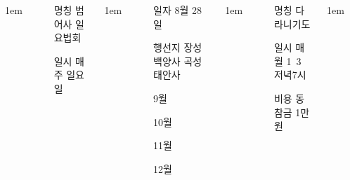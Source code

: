 \documentclass[	20pt, 
							a1paper, 
							portrait, %
							margin=0mm, %
							innermargin=10mm,  		%
							colspace=5mm, 
							subcolspace=0mm
							]{tikzposter}
\begin{document}
\begin{columns}


			{
					\setlength{\leftmargini}{4em}
					\setlength{\labelsep} {1em}
				\begin{LARGE}
					\begin{itemize}
					\item [명칭] 범어사 일요법회
					\item [일시] 매주 일요일
					\end{itemize}
				\end{LARGE}
			}


			{
					\setlength{\leftmargini}{5em}
					\setlength{\labelsep} {1em}
				\begin{LARGE}
					\begin{itemize}
					\item [일자] 8월 28일
					\item [행선지] 장성 백양사 곡성 태안사
					\item [9월] 
					\item [10월] 
					\item [11월] 
					\item [12월] 

					\end{itemize}
				\end{LARGE}
			}


			{
					\setlength{\leftmargini}{4em}
					\setlength{\labelsep} {1em}
				\begin{LARGE}
					\begin{itemize}
					\item [명칭] 다라니기도
					\item [일시] 매월 1~3 저녁7시
					\item [비용] 동참금 1만원
					\end{itemize}
				\end{LARGE}
			}


			{
					\setlength{\leftmargini}{4em}
					\setlength{\labelsep} {1em}
				\begin{LARGE}
				\end{LARGE}
			} %



	\end{columns}
\end{document}
